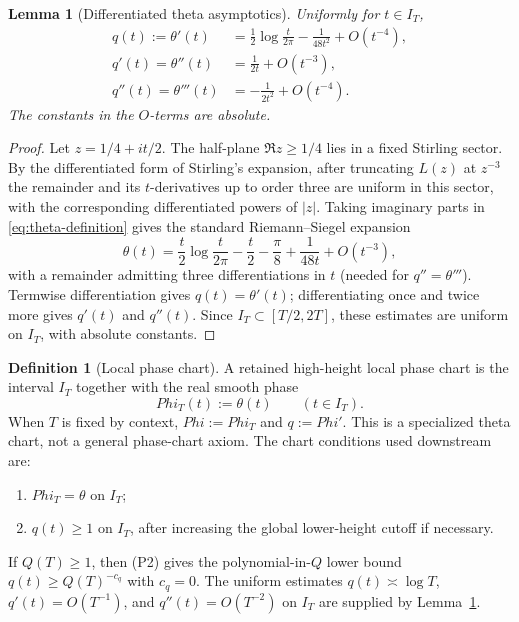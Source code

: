 \documentclass[11pt,a4paper]{amsart}
\def\Phi{Phi}%
\numberwithin{equation}{section}
\theoremstyle{plain}
\newtheorem{lemma}[theorem]{Lemma}
\theoremstyle{definition}
\newtheorem{definition}[theorem]{Definition}
\newcommand{\Ph}{\Phi}
\begin{document}
\begin{lemma}[Differentiated theta asymptotics]
\label{lem:theta-derivative-asymptotics}
Uniformly for \(t\in I_T\),
\begin{align}
\label{eq:theta-derivative-asymptotics}
q(t):=\theta'(t)
&=\frac12\log\frac{t}{2\pi}-\frac{1}{48 t^2}+O(t^{-4}),\\
q'(t)=\theta''(t)
&=\frac{1}{2t}+O(t^{-3}),\\
q''(t)=\theta'''(t)
&=-\frac{1}{2t^2}+O(t^{-4}).
\end{align}
The constants in the \(O\)-terms are absolute.
\end{lemma}

\begin{proof}
Let \(z=1/4+it/2\).  The half-plane \(\Re z\ge 1/4\) lies in a fixed
Stirling sector.  By the differentiated form of Stirling's expansion,
after truncating \(L(z)\) at \(z^{-3}\) the remainder and its
\(t\)-derivatives up to order three are uniform in this sector, with
the corresponding differentiated powers of \(|z|\).  Taking imaginary
parts in \eqref{eq:theta-definition} gives the standard
Riemann--Siegel expansion
\[
\theta(t)=\frac{t}{2}\log\frac{t}{2\pi}-\frac{t}{2}-\frac{\pi}{8}
          +\frac{1}{48 t}+O(t^{-3}),
\]
with a remainder admitting three differentiations in \(t\) (needed for
\(q''=\theta'''\)).  Termwise differentiation gives
\(q(t)=\theta'(t)\); differentiating once and twice more gives \(q'(t)\)
and \(q''(t)\).  Since \(I_T\subset[T/2,2T]\), these estimates are
uniform on \(I_T\), with absolute constants.
\end{proof}

\begin{definition}[Local phase chart]
\label{def:local-phase-chart}
A retained high-height local phase chart is the interval \(I_T\)
together with the real smooth phase
\[
        \Ph_T(t):=\theta(t)\qquad (t\in I_T).
\]
When \(T\) is fixed by context, \(\Ph := \Ph_T\) and \(q := \Ph'\).
This is a specialized theta chart, not a general phase-chart axiom.
The chart conditions used downstream are:
\begin{enumerate}[label=\textup{(P\arabic*)},leftmargin=*]
\item \(\Ph_T = \theta\) on \(I_T\);
\item \(q(t)\ge 1\) on \(I_T\), after increasing the global lower-height
      cutoff if necessary.
\end{enumerate}
If \(Q(T)\ge 1\), then (P2) gives the polynomial-in-\(Q\) lower bound
\(q(t)\ge Q(T)^{-c_q}\) with \(c_q = 0\).  The uniform estimates
\(q(t)\asymp \log T\), \(q'(t)=O(T^{-1})\), and
\(q''(t)=O(T^{-2})\) on \(I_T\) are supplied by
Lemma~\ref{lem:theta-derivative-asymptotics}.
\end{definition}
\end{document}
